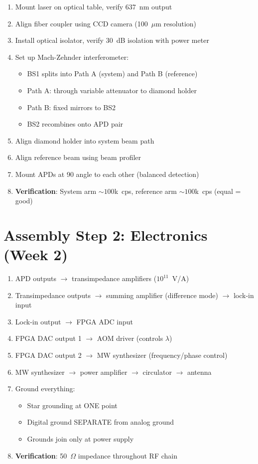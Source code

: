 \documentclass[11pt,a4paper,openany]{book}
\begin{document}
\begin{enumerate}[nosep]
  \item Mount laser on optical table, verify 637~nm output
  \item Align fiber coupler using CCD camera (100~$\mu$m resolution)
  \item Install optical isolator, verify 30~dB isolation with power meter
  \item Set up Mach-Zehnder interferometer:
    \begin{itemize}[nosep]
      \item BS1 splits into Path A (system) and Path B (reference)
      \item Path A: through variable attenuator to diamond holder
      \item Path B: fixed mirrors to BS2
      \item BS2 recombines onto APD pair
    \end{itemize}
  \item Align diamond holder into system beam path
  \item Align reference beam using beam profiler
  \item Mount APDs at 90\textdegree{} angle to each other (balanced detection)
  \item \textbf{Verification}: System arm ${\sim}100$k~cps, reference arm ${\sim}100$k~cps (equal = good)
\end{enumerate}

\section{Assembly Step 2: Electronics (Week 2)}

\begin{enumerate}[nosep]
  \item APD outputs $\to$ transimpedance amplifiers ($10^{11}$~V/A)
  \item Transimpedance outputs $\to$ summing amplifier (difference mode) $\to$ lock-in input
  \item Lock-in output $\to$ FPGA ADC input
  \item FPGA DAC output 1 $\to$ AOM driver (controls $\lambda$)
  \item FPGA DAC output 2 $\to$ MW synthesizer (frequency/phase control)
  \item MW synthesizer $\to$ power amplifier $\to$ circulator $\to$ antenna
  \item Ground everything:
    \begin{itemize}[nosep]
      \item Star grounding at ONE point
      \item Digital ground SEPARATE from analog ground
      \item Grounds join only at power supply
    \end{itemize}
  \item \textbf{Verification}: 50~$\Omega$ impedance throughout RF chain
\end{enumerate}
\end{document}

